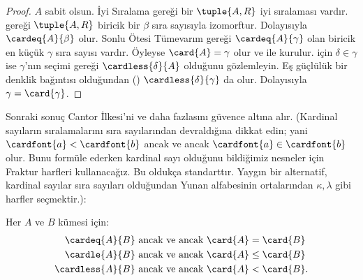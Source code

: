 \documentclass[../../../include/open-logic-section]{subfiles}
\begin{document}
\begin{proof}
$A$ sabit olsun. İyi Sıralama gereği bir $\tuple{A,R}$ iyi sıralaması
vardır.  gereği
$\tuple{A,R}$ biricik bir $\beta$ sıra sayısıyla izomorftur. Dolayısıyla
$\cardeq{A}{\beta}$ olur. Sonlu Ötesi Tümevarım gereği
$\cardeq{A}{\gamma}$ olan biricik en küçük $\gamma$ sıra sayısı vardır.
Öyleyse $\card{A}=\gamma$ olur ve  ile
 kurulur.  için $\delta\in\gamma$ ise
$\gamma$'nın seçimi gereği $\cardless{\delta}{A}$ olduğunu gözlemleyin.
Eş güçlülük bir denklik bağıntısı olduğundan
()
$\cardless{\delta}{\gamma}$ da olur. Dolayısıyla
$\gamma=\card{\gamma}$.
\end{proof}

Sonraki sonuç Cantor İlkesi'ni ve daha fazlasını güvence altına alır.
(Kardinal sayıların sıralamalarını sıra sayılarından devraldığına dikkat
edin; yani $\cardfont{a}<\cardfont{b}$ ancak ve ancak
$\cardfont{a}\in\cardfont{b}$ olur. Bunu formüle ederken kardinal sayı
olduğunu bildiğimiz nesneler için Fraktur harfleri kullanacağız. Bu oldukça
standarttır. Yaygın bir alternatif, kardinal sayılar sıra sayıları olduğundan
Yunan alfabesinin ortalarından $\kappa,\lambda$ gibi harfler seçmektir.):
\begin{lem}
Her $A$ ve $B$ kümesi için:
\begin{align*}
	\cardeq{A}{B} &\text{ ancak ve ancak } \card{A} = \card{B}\\
	\cardle{A}{B} &\text{ ancak ve ancak } \card{A} \leq \card{B}\\
	\cardless{A}{B}&\text{ ancak ve ancak } \card{A} < \card{B}.
\end{align*}
\end{lem}
\end{document}
